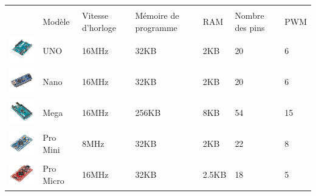 \begin{table}[hbt!]
    \centering
    \begin{tabular}{|C{3cm}|C{2cm}|C{2.2cm}|C{2.2cm}|C{1.2cm}|C{1.5cm}|C{1.2cm}|}%
        \hline
        &&&&&&\\ %
        & Modèle & Vitesse d'horloge & Mémoire de programme & RAM & Nombre des pins & PWM \\[18pt]
        \hline
        \includegraphics[width=3cm]{assets/arduino/leonardo.png} & UNO & 16MHz & 32KB & 2KB & 20 & 6 \\
        \hline
        \includegraphics[width=3cm]{assets/arduino/nano.png} & Nano & 16MHz & 32KB & 2KB & 20 & 6 \\
        \hline
        \includegraphics[width=3cm]{assets/arduino/mega.png} & Mega & 16MHz & 256KB & 8KB & 54 & 15 \\
        \hline
        \includegraphics[width=3cm]{assets/arduino/pro mini.png} & Pro Mini & 8MHz & 32KB & 2KB & 22 & 8 \\
        \hline
        \includegraphics[width=3cm]{assets/arduino/pro micro.png} & Pro Micro & 16MHz & 32KB & 2.5KB & 18 & 5 \\

\end{tabular}
\end{table}
